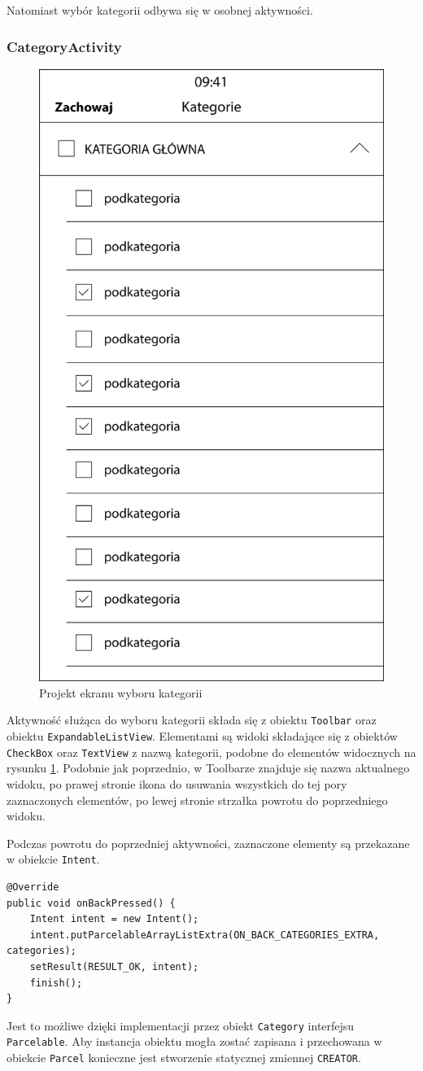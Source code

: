 \documentclass[twoside]{projektInzynierskiMS}
\begin{document}
Natomiast wybór kategorii odbywa się w osobnej aktywności.

\subsubsection{CategoryActivity}

\begin{figure}[h]
  \centering
  \includegraphics[width=0.4\linewidth]{img/CategoriesProject.png}
  \caption{Projekt ekranu wyboru kategorii}
  \label{fig:androidCategories}
\end{figure}

Aktywność służąca do wyboru kategorii składa się z obiektu \verb`Toolbar` oraz obiektu \verb`ExpandableListView`. Elementami są widoki składające się z obiektów \verb`CheckBox` oraz \verb`TextView` z nazwą kategorii, podobne do elementów widocznych na rysunku \ref{fig:androidCategories}. Podobnie jak poprzednio, w Toolbarze znajduje się nazwa aktualnego widoku, po prawej stronie ikona do usuwania wszystkich do tej pory zaznaczonych elementów, po lewej stronie strzałka powrotu do poprzedniego widoku. 

Podczas powrotu do poprzedniej aktywności, zaznaczone elementy są przekazane w obiekcie \verb`Intent`. 

\begin{verbatim}
@Override
public void onBackPressed() {
    Intent intent = new Intent();
    intent.putParcelableArrayListExtra(ON_BACK_CATEGORIES_EXTRA, categories);
    setResult(RESULT_OK, intent);
    finish();
}
\end{verbatim} 

Jest to możliwe dzięki implementacji przez obiekt \verb`Category` interfejsu \verb`Parcelable`. Aby instancja obiektu mogła zostać zapisana i przechowana w obiekcie \verb`Parcel` konieczne jest stworzenie statycznej zmiennej \verb`CREATOR`.
\end{document}
